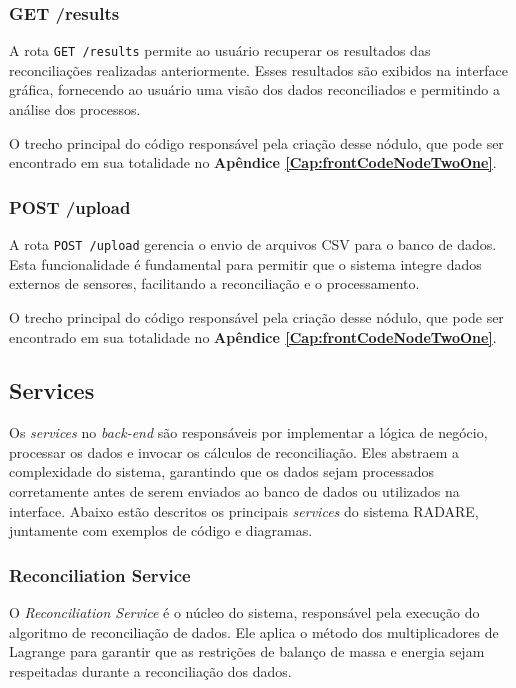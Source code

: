 \subsubsection{GET /results}

A rota \texttt{GET /results} permite ao usuário recuperar os resultados das reconciliações realizadas anteriormente. Esses resultados são exibidos na interface gráfica, fornecendo ao usuário uma visão dos dados reconciliados e permitindo a análise dos processos.

O trecho principal do código responsável pela criação desse nódulo, que pode ser encontrado em sua totalidade no \textbf{Apêndice \ref{Cap:frontCodeNodeTwoOne}}.

\subsubsection{POST /upload}

A rota \texttt{POST /upload} gerencia o envio de arquivos CSV para o banco de dados. Esta funcionalidade é fundamental para permitir que o sistema integre dados externos de sensores, facilitando a reconciliação e o processamento.

O trecho principal do código responsável pela criação desse nódulo, que pode ser encontrado em sua totalidade no \textbf{Apêndice \ref{Cap:frontCodeNodeTwoOne}}.

\subsection{Services}

Os \textit{services} no \textit{back-end} são responsáveis por implementar a lógica de negócio, processar os dados e invocar os cálculos de reconciliação. Eles abstraem a complexidade do sistema, garantindo que os dados sejam processados corretamente antes de serem enviados ao banco de dados ou utilizados na interface. Abaixo estão descritos os principais \textit{services} do sistema RADARE, juntamente com exemplos de código e diagramas.

\subsubsection{Reconciliation Service}

O \textit{Reconciliation Service} é o núcleo do sistema, responsável pela execução do algoritmo de reconciliação de dados. Ele aplica o método dos multiplicadores de Lagrange para garantir que as restrições de balanço de massa e energia sejam respeitadas durante a reconciliação dos dados.

